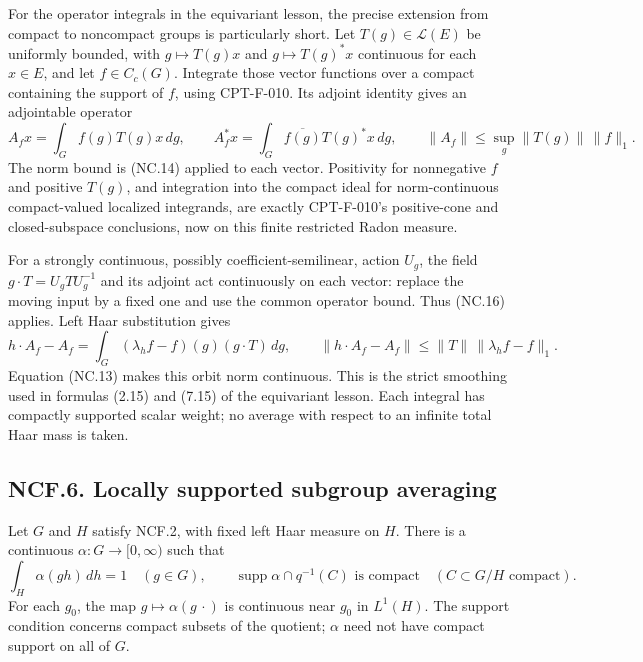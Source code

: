 \documentclass[
  11pt,
]{article}
\begin{document}
For the operator integrals in the equivariant lesson, the precise
extension from compact to noncompact groups is particularly short. Let
\(T(g)\in\mathcal L(E)\) be uniformly bounded, with \(g\mapsto T(g)x\)
and \(g\mapsto T(g)^*x\) continuous for each \(x\in E\), and let
\(f\in C_c(G)\). Integrate those vector functions over a compact
containing the support of \(f\), using CPT-F-010. Its adjoint identity
gives an adjointable operator \[
 A_f x=\int_G f(g)T(g)x\,dg,\qquad
 A_f^*x=\int_G\overline{f(g)}T(g)^*x\,dg,\qquad
 \|A_f\|\leq \sup_g\|T(g)\|\,\|f\|_1.                 \tag{NC.16}
\] The norm bound is (NC.14) applied to each vector. Positivity for
nonnegative \(f\) and positive \(T(g)\), and integration into the
compact ideal for norm-continuous compact-valued localized integrands,
are exactly CPT-F-010's positive-cone and closed-subspace conclusions,
now on this finite restricted Radon measure.

For a strongly continuous, possibly coefficient-semilinear, action
\(U_g\), the field \(g\cdot T=U_gTU_g^{-1}\) and its adjoint act
continuously on each vector: replace the moving input by a fixed one and
use the common operator bound. Thus (NC.16) applies. Left Haar
substitution gives \[
 h\cdot A_f-A_f
   =\int_G(\lambda_hf-f)(g)(g\cdot T)\,dg,\qquad
 \|h\cdot A_f-A_f\|
   \leq\|T\|\,\|\lambda_hf-f\|_1.                     \tag{NC.17}
\] Equation (NC.13) makes this orbit norm continuous. This is the strict
smoothing used in formulas (2.15) and (7.15) of the equivariant lesson.
Each integral has compactly supported scalar weight; no average with
respect to an infinite total Haar mass is taken.

\subsection{NCF.6. Locally supported subgroup
averaging}\label{ncf.6.-locally-supported-subgroup-averaging}

Let \(G\) and \(H\) satisfy NCF.2, with fixed left Haar measure on
\(H\). There is a continuous \(\alpha:G\to[0,\infty)\) such that \[
 \int_H\alpha(gh)\,dh=1\quad(g\in G),\qquad
 \operatorname{supp}\alpha\cap q^{-1}(C)\text{ is compact}
 \quad(C\subset G/H\text{ compact}).                       \tag{NC.18}
\] For each \(g_0\), the map \(g\mapsto\alpha(g\,\cdot)\) is continuous
near \(g_0\) in \(L^1(H)\). The support condition concerns compact
subsets of the quotient; \(\alpha\) need not have compact support on all
of \(G\).
\end{document}
